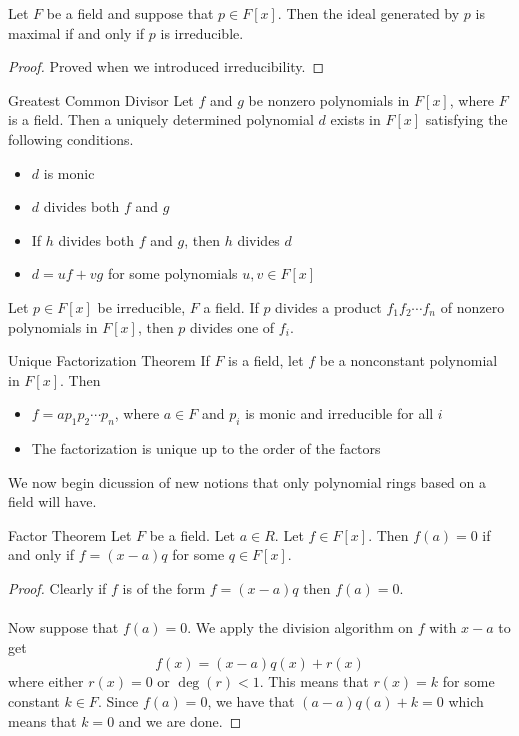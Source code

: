 \documentclass[a4paper]{article}
\begin{document}
\begin{lmm}{}{} Let $F$ be a field and suppose that $p\in F[x]$. Then the ideal generated by $p$ is maximal if and only if $p$ is irreducible. \tcbline
\begin{proof}
Proved when we introduced irreducibility. 
\end{proof}
\end{lmm}

\begin{prp}{Greatest Common Divisor}{} Let $f$ and $g$ be nonzero polynomials in $F[x]$, where $F$ is a field. Then a uniquely determined polynomial $d$ exists in $F[x]$ satisfying the following conditions. 
\begin{itemize}
\item $d$ is monic
\item $d$ divides both $f$ and $g$
\item If $h$ divides both $f$ and $g$, then $h$ divides $d$
\item $d=uf+vg$ for some polynomials $u,v\in F[x]$
\end{itemize}
\end{prp}

\begin{prp}{}{} Let $p\in F[x]$ be irreducible, $F$ a field. If $p$ divides a product $f_1f_2\cdots f_n$ of nonzero polynomials in $F[x]$, then $p$ divides one of $f_i$. 
\end{prp}

\begin{thm}{Unique Factorization Theorem}{} If $F$ is a field, let $f$ be a nonconstant polynomial in $F[x]$. Then 
\begin{itemize}
\item $f=ap_1p_2\cdots p_n$, where $a\in F$ and $p_i$ is monic and irreducible for all $i$
\item The factorization is unique up to the order of the factors
\end{itemize}
\end{thm}

We now begin dicussion of new notions that only polynomial rings based on a field will have. 

\begin{thm}{Factor Theorem}{} Let $F$ be a field. Let $a\in R$. Let $f\in F[x]$. Then $f(a)=0$ if and only if $f=(x-a)q$ for some $q\in F[x]$. \tcbline
\begin{proof}
Clearly if $f$ is of the form $f=(x-a)q$ then $f(a)=0$. \\~\\
Now suppose that $f(a)=0$. We apply the division algorithm on $f$ with $x-a$ to get $$f(x)=(x-a)q(x)+r(x)$$ where either $r(x)=0$ or $\deg(r)<1$. This means that $r(x)=k$ for some constant $k\in F$. Since $f(a)=0$, we have that $(a-a)q(a)+k=0$ which means that $k=0$ and we are done. 
\end{proof}
\end{thm}
\end{document}
